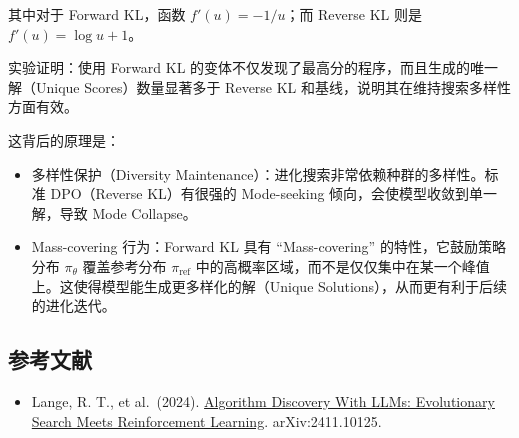 其中对于 Forward KL，函数 \(f'(u) = -1/u\)；而 Reverse KL 则是 \(f'(u) = \log u + 1\)。

实验证明：使用 Forward KL 的变体不仅发现了最高分的程序，而且生成的唯一解（Unique Scores）数量显著多于 Reverse KL 和基线，说明其在维持搜索多样性方面有效。

这背后的原理是：

\begin{itemize}
\tightlist
\item
  多样性保护（Diversity Maintenance）：进化搜索非常依赖种群的多样性。标准 DPO（Reverse KL）有很强的 Mode-seeking 倾向，会使模型收敛到单一解，导致 Mode Collapse。
\item
  Mass-covering 行为：Forward KL 具有 ``Mass-covering'' 的特性，它鼓励策略分布 \(\pi_\theta\) 覆盖参考分布 \(\pi_{\mathrm{ref}}\) 中的高概率区域，而不是仅仅集中在某一个峰值上。这使得模型能生成更多样化的解（Unique Solutions），从而更有利于后续的进化迭代。
\end{itemize}

\hypertarget{ux53c2ux8003ux6587ux732e-146}{%
\subsection{参考文献}\label{ux53c2ux8003ux6587ux732e-146}}

\begin{itemize}
\tightlist
\item
  Lange, R. T., et al.~(2024). \href{https://arxiv.org/abs/2411.10125}{Algorithm Discovery With LLMs: Evolutionary Search Meets Reinforcement Learning}. arXiv:2411.10125.
\end{itemize}

\clearpage
